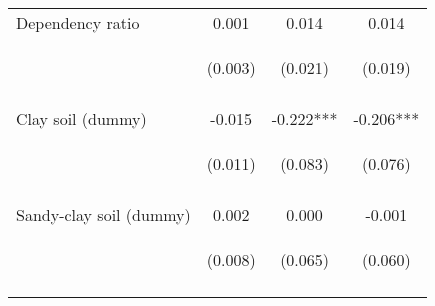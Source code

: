 \begin{center}
\begin{tabular}{lccc}
Dependency ratio & 0.001 & 0.014 & 0.014 \\
 & \begin{footnotesize}(0.003)\end{footnotesize} & \begin{footnotesize}(0.021)\end{footnotesize} & \begin{footnotesize}(0.019)\end{footnotesize} \\
\vspace{4pt} & \begin{footnotesize}[0.689]\end{footnotesize} & \begin{footnotesize}[0.513]\end{footnotesize} & \begin{footnotesize}[0.454]\end{footnotesize} \\
Clay soil (dummy) & -0.015 & -0.222*** & -0.206*** \\
 & \begin{footnotesize}(0.011)\end{footnotesize} & \begin{footnotesize}(0.083)\end{footnotesize} & \begin{footnotesize}(0.076)\end{footnotesize} \\
\vspace{4pt} & \begin{footnotesize}[0.144]\end{footnotesize} & \begin{footnotesize}[0.008]\end{footnotesize} & \begin{footnotesize}[0.007]\end{footnotesize} \\
Sandy-clay soil (dummy) & 0.002 & 0.000 & -0.001 \\
 & \begin{footnotesize}(0.008)\end{footnotesize} & \begin{footnotesize}(0.065)\end{footnotesize} & \begin{footnotesize}(0.060)\end{footnotesize} \\
\vspace{4pt} & \begin{footnotesize}[0.830]\end{footnotesize} & \begin{footnotesize}[0.998]\end{footnotesize} & \begin{footnotesize}[0.993]\end{footnotesize} \\

\end{tabular}
\end{center}

